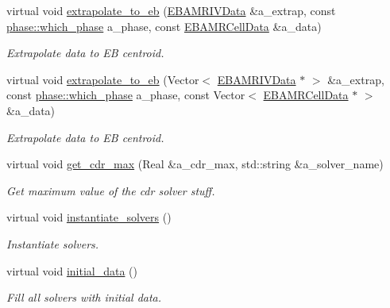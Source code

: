 \begin{DoxyCompactItemize}
virtual void \hyperlink{classtime__stepper_aef015bc787fa4af1698665c7c3c096e3}{extrapolate\+\_\+to\+\_\+eb} (\hyperlink{type__definitions_8H_a6b8fa905d55cbb491b52180386f0e0c1}{E\+B\+A\+M\+R\+I\+V\+Data} \&a\+\_\+extrap, const \hyperlink{namespacephase_a23c76f548a5eb1955ed8c929c541108b}{phase\+::which\+\_\+phase} a\+\_\+phase, const \hyperlink{type__definitions_8H_a7e610f301989e5e07781c5e338bdb7c3}{E\+B\+A\+M\+R\+Cell\+Data} \&a\+\_\+data)
\begin{DoxyCompactList}\small\item\em Extrapolate data to EB centroid. \end{DoxyCompactList}\item 
virtual void \hyperlink{classtime__stepper_a1ad1903ce4f7d2478c31eedf7e35ab51}{extrapolate\+\_\+to\+\_\+eb} (Vector$<$ \hyperlink{type__definitions_8H_a6b8fa905d55cbb491b52180386f0e0c1}{E\+B\+A\+M\+R\+I\+V\+Data} $\ast$ $>$ \&a\+\_\+extrap, const \hyperlink{namespacephase_a23c76f548a5eb1955ed8c929c541108b}{phase\+::which\+\_\+phase} a\+\_\+phase, const Vector$<$ \hyperlink{type__definitions_8H_a7e610f301989e5e07781c5e338bdb7c3}{E\+B\+A\+M\+R\+Cell\+Data} $\ast$ $>$ \&a\+\_\+data)
\begin{DoxyCompactList}\small\item\em Extrapolate data to EB centroid. \end{DoxyCompactList}\item 
virtual void \hyperlink{classtime__stepper_a6bac172529a0585fac66354753a88914}{get\+\_\+cdr\+\_\+max} (Real \&a\+\_\+cdr\+\_\+max, std\+::string \&a\+\_\+solver\+\_\+name)
\begin{DoxyCompactList}\small\item\em Get maximum value of the cdr solver stuff. \end{DoxyCompactList}\item 
virtual void \hyperlink{classtime__stepper_a072f8c98c88aba9917a5e78007301713}{instantiate\+\_\+solvers} ()
\begin{DoxyCompactList}\small\item\em Instantiate solvers. \end{DoxyCompactList}\item 
virtual void \hyperlink{classtime__stepper_a184ee525a253c774398949d4e6526625}{initial\+\_\+data} ()
\begin{DoxyCompactList}\small\item\em Fill all solvers with initial data. \end{DoxyCompactList}\item 

\end{DoxyCompactItemize}
